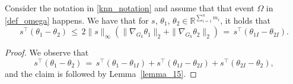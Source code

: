\documentclass[twoside,11pt]{article}
\begin{document}



\begin{lemma}
    \label{lemma_16}
    Consider the notation in \ref{knn_notation} and assume that that event \(\Omega\) in \eqref{def_omega} happens. We have that for \(s\), \(\theta_1\), \(\theta_2 \in \mathbb{R}^{\sum_{i = 1}^n   m_i}\), it holds that
\[
s^\top (\theta_1 - \theta_2) \,\leq\, 2\|s\|_{\infty} (\|\nabla_{G_k}\theta_{1}\|_2 + \|\nabla_{G_k}\theta_{2}\|_2) \,=\, s^\top (\theta_{1I} - \theta_{2I}) .
\] 
\end{lemma}
\begin{proof}
     We observe that
\[
s^\top (\theta_1 - \theta_2) \,=\, s^\top (\theta_1 - \theta_{1I}) + s^\top (\theta_{1I} - \theta_{2I}) + s^\top (\theta_{2I} - \theta_2),
\]
and the claim is followed by Lemma~\ref{lemma_15}. 
 \end{proof}
\end{document}
